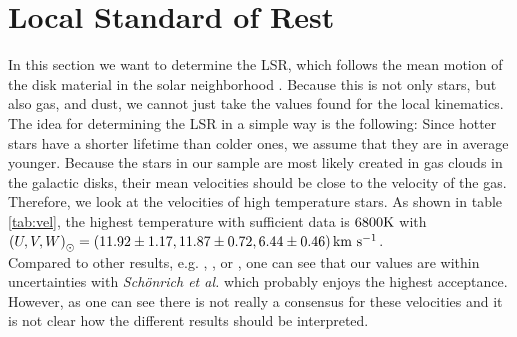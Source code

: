 \documentclass{aastex62}
\begin{document}

	\begin{figure}[ht!]
	\label{fig:lsrmean}
	\end{figure}

	\section{Local Standard of Rest} \label{lsr}
	\noindent
	In this section we want to determine the LSR, which follows the mean motion of the disk material in the solar neighborhood \citep{shu}. Because this is not only stars, but also gas, and dust, we cannot just take the values found for the local kinematics. The idea for determining the LSR in a simple way is the following: Since hotter stars have a shorter lifetime than colder ones, we assume that they are in average younger. Because the stars in our sample are most likely created in gas clouds in the galactic disks, their mean velocities should be close to the velocity of the gas. Therefore, we look at the velocities of high temperature stars. As shown in table \ref{tab:vel}, the highest temperature with sufficient data is $6800\rm K$ with $\left( U, V, W\right)_\odot=\left( 11.92\pm1.17, 11.87\pm0.72, 6.44\pm0.46 \right)\rm km~s^{-1}$.
	\\
	Compared to other results, e.g. \citep{schoenrich}, \citep{boby}, \citep{anotherlsr} or \citep{ding}, one can see that our values are within uncertainties with \textit{Sch\"onrich et al.} which probably enjoys the highest acceptance. However, as one can see there is not really a consensus for these velocities and it is not clear how the different results should be interpreted.
	
\end{document}

